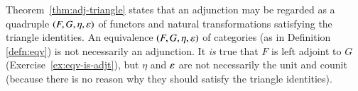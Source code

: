 \begin{remark}
\label{rmk:eqvs-vs-adjts}
%
%
%
%
Theorem~\ref{thm:adj-triangle} states that an adjunction may be regarded as
a quadruple $(F, G, \eta, \varepsilon)$ of functors and natural transformations
satisfying the triangle identities.  An equivalence $(F, G, \eta, \varepsilon)$
of categories (as in Definition \ref{defn:eqv}) is not necessarily an
adjunction.  It \emph{is} true that $F$ is left adjoint to $G$
(Exercise~\ref{ex:eqv-is-adjt}), but $\eta$ and $\varepsilon$ are not
necessarily the unit and counit (because there is no reason why they should
satisfy the triangle identities).
\end{remark}

